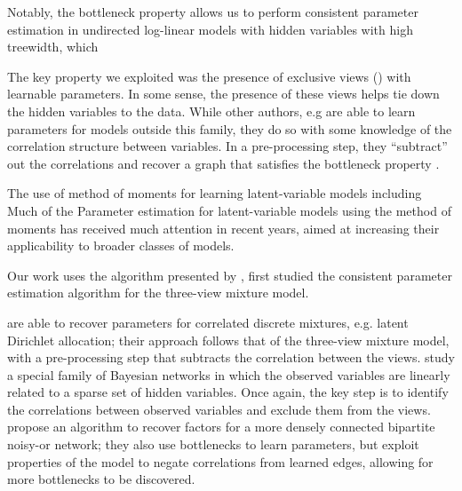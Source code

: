 Notably, the bottleneck property allows us to perform consistent parameter
estimation in undirected log-linear models with hidden variables with high
treewidth, which 

The key property we exploited was the presence of exclusive views
  () with learnable parameters.
In some sense, the presence of these views helps tie down the hidden
  variables to the data. 
While other authors, e.g \citet{anandkumar12lda, anandkumar2013linear,
  halpern13noisyor} are able to learn parameters for models outside this
  family, they do so with some knowledge of the correlation structure
  between variables. 
In a pre-processing step, they ``subtract'' out the correlations and
  recover a graph that satisfies the bottleneck property
  .

The use of method of moments for learning latent-variable models
including 
Much of the Parameter estimation for latent-variable models using the method of
  moments has received much attention in recent years,
aimed at increasing their applicability to broader classes of models.

Our work uses the \TensorFactorize algorithm presented by
  \citet{anandkumar13tensor}, first
  studied the consistent parameter estimation algorithm for the
  three-view mixture model.


\citet{anandkumar12lda} are able to recover parameters for correlated
  discrete mixtures, e.g. latent Dirichlet allocation; their approach
  follows that of the three-view mixture model, with a pre-processing step
  that subtracts the correlation between the views.
\citet{anandkumar2013linear} study a special family of Bayesian networks
  in which the observed variables are linearly related to a sparse set of
  hidden variables. Once again, the key step is to identify the
  correlations between observed variables and exclude them from the views.
\citet{halpern13noisyor} propose an algorithm to recover factors for
  a more densely connected bipartite noisy-or network; they also use
  bottlenecks to learn parameters, but exploit properties of the model
  to negate correlations from learned edges, allowing for more
  bottlenecks to be discovered. 

